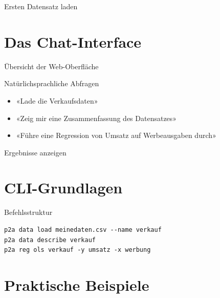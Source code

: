 \documentclass[aspectratio=169]{beamer}
\begin{document}
\begin{frame}{Ersten Datensatz laden}
\end{frame}

\section{Das Chat-Interface}

\begin{frame}{Übersicht der Web-Oberfläche}
\end{frame}

\begin{frame}{Natürlichsprachliche Abfragen}
    \begin{itemize}
        \item «Lade die Verkaufsdaten»
        \item «Zeig mir eine Zusammenfassung des Datensatzes»
        \item «Führe eine Regression von Umsatz auf Werbeausgaben durch»
    \end{itemize}
\end{frame}

\begin{frame}{Ergebnisse anzeigen}
\end{frame}

\section{CLI-Grundlagen}

\begin{frame}[fragile]{Befehlsstruktur}
    \begin{lstlisting}
p2a data load meinedaten.csv --name verkauf
p2a data describe verkauf
p2a reg ols verkauf -y umsatz -x werbung
    \end{lstlisting}
\end{frame}

\section{Praktische Beispiele}
\end{document}
